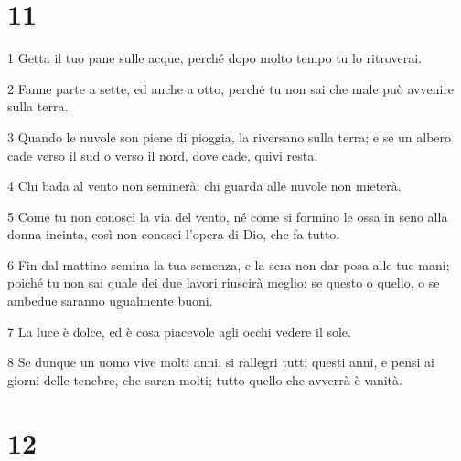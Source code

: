 \chapter{11}

\par 1 Getta il tuo pane sulle acque, perché dopo molto tempo tu lo ritroverai.
\par 2 Fanne parte a sette, ed anche a otto, perché tu non sai che male può avvenire sulla terra.
\par 3 Quando le nuvole son piene di pioggia, la riversano sulla terra; e se un albero cade verso il sud o verso il nord, dove cade, quivi resta.
\par 4 Chi bada al vento non seminerà; chi guarda alle nuvole non mieterà.
\par 5 Come tu non conosci la via del vento, né come si formino le ossa in seno alla donna incinta, così non conosci l'opera di Dio, che fa tutto.
\par 6 Fin dal mattino semina la tua semenza, e la sera non dar posa alle tue mani; poiché tu non sai quale dei due lavori riuscirà meglio: se questo o quello, o se ambedue saranno ugualmente buoni.
\par 7 La luce è dolce, ed è cosa piacevole agli occhi vedere il sole.
\par 8 Se dunque un uomo vive molti anni, si rallegri tutti questi anni, e pensi ai giorni delle tenebre, che saran molti; tutto quello che avverrà è vanità.

\chapter{12}

